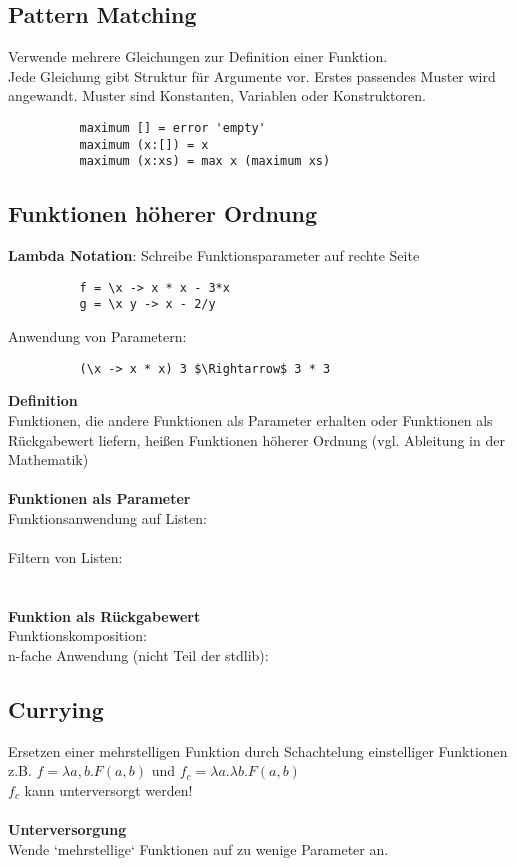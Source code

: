 \subsection{Pattern Matching}%
\label{hsk:sub:pattern-matching}
Verwende mehrere Gleichungen zur Definition einer Funktion.\\
Jede Gleichung gibt Struktur für Argumente vor. Erstes passendes Muster wird angewandt.
Muster sind Konstanten, Variablen oder Konstruktoren.
\begin{lstlisting}
          maximum [] = error 'empty'
          maximum (x:[]) = x
          maximum (x:xs) = max x (maximum xs)
\end{lstlisting}

\subsection{Funktionen höherer Ordnung}%
\label{hsk:sub:funktionen-hoeherer-ordnung}
\textbf{Lambda Notation}:
Schreibe Funktionsparameter auf rechte Seite
\begin{lstlisting}
          f = \x -> x * x - 3*x
          g = \x y -> x - 2/y
\end{lstlisting}
Anwendung von Parametern:
\begin{lstlisting}
          (\x -> x * x) 3 $\Rightarrow$ 3 * 3
\end{lstlisting}
\textbf{Definition}\\
Funktionen, die andere Funktionen als Parameter erhalten oder Funktionen als Rückgabewert liefern, heißen Funktionen höherer Ordnung (vgl. Ableitung in der Mathematik)\\\\
\textbf{Funktionen als Parameter}\\
Funktionsanwendung auf Listen:\\
\\

Filtern von Listen:\\
\\\\
\textbf{Funktion als Rückgabewert}\\
Funktionskomposition: \\
n-fache Anwendung (nicht Teil der stdlib): 

\subsection{Currying}%
\label{hsk:sub:currying}
Ersetzen einer mehrstelligen Funktion durch Schachtelung einstelliger Funktionen\\
z.B. \(f = \lambda a, b.F(a,b)\) und \(f_c = \lambda a.\lambda b. F(a, b)\)\\
\(f_c\) kann unterversorgt werden!\\\\
\textbf{Unterversorgung}\\
Wende `mehrstellige` Funktionen auf zu wenige Parameter an.

